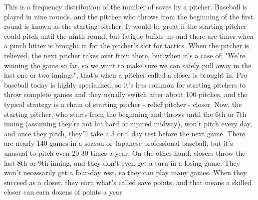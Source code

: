 \documentclass{ltjsbook}
\begin{document}
	This is a frequency distribution of the number of saves by a pitcher. Baseball is played in nine rounds, and the pitcher who throws from the beginning of the first round is known as the starting pitcher. It would be great if the starting pitcher could pitch until the ninth round, but fatigue builds up and there are times when a pinch hitter is brought in for the pitcher's slot for tactics. When the pitcher is relieved, the next pitcher takes over from there, but when it's a case of; "We're winning the game so far, so we want to make sure we can safely pull away in the last one or two innings", that's when a pitcher called a closer is brought in. Pro baseball today is highly specialized, so it's less common for starting pitchers to throw complete games and they usually switch after about 100 pitches, and the typical strategy is a chain of starting pitcher - relief pitcher - closer. Now, the starting pitcher, who starts from the beginning and throws until the 6th or 7th inning (assuming they're not hit hard or injured midway), won't pitch every day, and once they pitch, they'll take a 3 or 4 day rest before the next game. There are nearly 140 games in a season of Japanese professional baseball, but it's unusual to pitch even 20-30 times a year. On the other hand, closers throw the last 8th or 9th inning, and they don't even get a turn in a losing game. They won't necessarily get a four-day rest, so they can play many games. When they succeed as a closer, they earn what's called save points, and that means a skilled closer can earn dozens of points a year.
\end{document}
